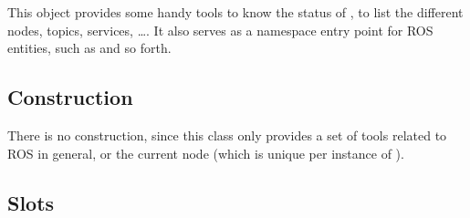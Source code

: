 This object provides some handy tools to know the status of ,
to list the different nodes, topics, services, \ldots.  It also serves as a
namespace entry point for ROS entities, such as  and so
forth.

\subsection{Construction}

There is no construction, since this class only provides a set of tools
related to ROS in general, or the current node (which is unique per instance
of \urbi).

\subsection{Slots}

